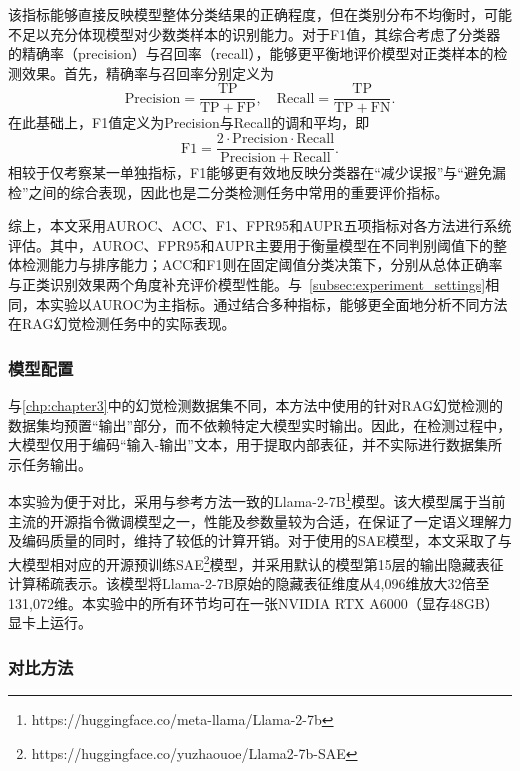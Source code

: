 该指标能够直接反映模型整体分类结果的正确程度，但在类别分布不均衡时，可能不足以充分体现模型对少数类样本的识别能力。对于F1值，其综合考虑了分类器的精确率（precision）与召回率（recall），能够更平衡地评价模型对正类样本的检测效果。首先，精确率与召回率分别定义为
\begin{equation}
\mathrm{Precision}=\frac{\mathrm{TP}}{\mathrm{TP}+\mathrm{FP}},
\quad \mathrm{Recall}=\frac{\mathrm{TP}}{\mathrm{TP}+\mathrm{FN}}.
\end{equation}
在此基础上，F1值定义为Precision与Recall的调和平均，即
\begin{equation}
\mathrm{F1}=\frac{2\cdot \mathrm{Precision}\cdot \mathrm{Recall}}{\mathrm{Precision}+\mathrm{Recall}}.
\end{equation}
相较于仅考察某一单独指标，F1能够更有效地反映分类器在“减少误报”与“避免漏检”之间的综合表现，因此也是二分类检测任务中常用的重要评价指标。

综上，本文采用AUROC、ACC、F1、FPR95和AUPR五项指标对各方法进行系统评估。其中，AUROC、FPR95和AUPR主要用于衡量模型在不同判别阈值下的整体检测能力与排序能力；ACC和F1则在固定阈值分类决策下，分别从总体正确率与正类识别效果两个角度补充评价模型性能。与~\ref{subsec:experiment_settings}相同，本实验以AUROC为主指标。通过结合多种指标，能够更全面地分析不同方法在RAG幻觉检测任务中的实际表现。

\subsubsection{模型配置}

与\ref{chp:chapter3}中的幻觉检测数据集不同，本方法中使用的针对RAG幻觉检测的数据集均预置“输出”部分，而不依赖特定大模型实时输出。因此，在检测过程中，大模型仅用于编码“输入-输出”文本，用于提取内部表征，并不实际进行数据集所示任务输出。

本实验为便于对比，采用与参考方法一致的Llama-2-7B\footnote{https://huggingface.co/meta-llama/Llama-2-7b\cite{touvron2023llama2}}模型。该大模型属于当前主流的开源指令微调模型之一，性能及参数量较为合适，在保证了一定语义理解力及编码质量的同时，维持了较低的计算开销。对于使用的SAE模型，本文采取了与大模型相对应的开源预训练SAE\footnote{https://huggingface.co/yuzhaouoe/Llama2-7b-SAE\cite{zhao2025steering}}模型，并采用默认的模型第15层的输出隐藏表征计算稀疏表示。该模型将Llama-2-7B原始的隐藏表征维度从4,096维放大32倍至131,072维。本实验中的所有环节均可在一张NVIDIA RTX A6000（显存48GB）显卡上运行。

\subsubsection{对比方法}

